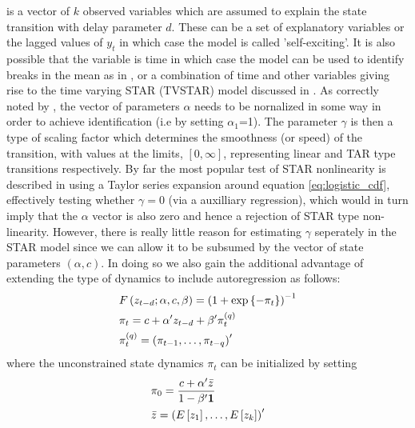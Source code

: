 is a vector of $k$ observed variables which are assumed to explain the state
transition with delay parameter $d$. These can be a set of explanatory variables
or the lagged values of $y_t$ in which case the model is called 'self-exciting'.
It is also possible that the variable is time in which case the model can be
used to identify breaks in the mean as in \cite{Lin1994}, or a combination of
time and other variables giving rise to the time varying STAR (TVSTAR) model 
discussed in \cite{Lundbergh2003}. As correctly noted by \cite{Dijk1999}, the
vector of parameters $\alpha$ needs to be nornalized in some way in order to
achieve identification (i.e by setting $\alpha_1$=1). The parameter $\gamma$ is
then a type of scaling factor which determines the smoothness (or speed) of the
transition, with values at the limits, $\left[ {0,\infty } \right]$,
representing linear and TAR type transitions respectively. By far the most
popular test of STAR nonlinearity is described in \cite{Luukkonen1988} using a
Taylor series expansion around equation \ref{eq:logistic_cdf},
effectively testing whether $\gamma=0$ (via a auxilliary regression), which
would in turn imply that the $\alpha$ vector is also zero and hence a rejection
of STAR type non-linearity.
However, there is really little reason for estimating $\gamma$ seperately in the
STAR model since we can allow it to be subsumed by the vector of state 
parameters $\left(\alpha, c \right)$. In doing so we also gain the additional
advantage of extending the type of dynamics to include autoregression as
follows:
\begin{equation}\label{eq:star_new}
\begin{gathered}
  F\left( {{z_{t-d}}; \alpha , c,\beta} \right) = {\left( {1 + \exp \left\{ -{{\pi
  _t}} \right\}} \right)^{ - 1}} \hfill \\
  {\pi _t} =  c +  \alpha '{z_{t-d}} + \beta '\pi _t^{\left( q \right)} \hfill \\
  \pi _t^{\left( q \right)} = {\left( {{\pi _{t - 1}},\dots,{\pi _{t - q}}}
  \right)^\prime } \hfill \\
\end{gathered}
\end{equation}
where the unconstrained state dynamics $\pi_t$ can be initialized by setting
\begin{equation}
\begin{gathered}
  {\pi _0} = \frac{{c + \alpha '\bar z}}
{{1 - \beta '{\mathbf{1}}}} \hfill \\
  \bar z = {\left( {E\left[ {{z_1}} \right],\ldots,E\left[ {{z_k}} \right]}
  \right)^\prime } \hfill \\
\end{gathered}
\end{equation}
